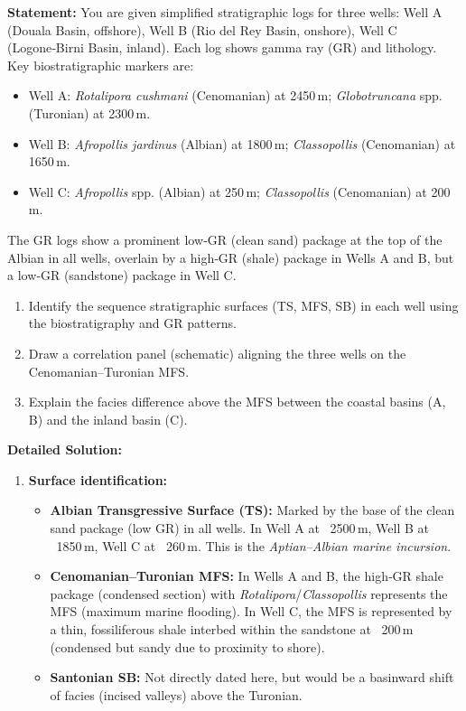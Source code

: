 \documentclass[11pt]{article}
\begin{document}
\begin{exoresolu}
\textbf{Statement:} You are given simplified stratigraphic logs for three wells: Well A (Douala Basin, offshore), Well B (Rio del Rey Basin, onshore), Well C (Logone‑Birni Basin, inland). Each log shows gamma ray (GR) and lithology. Key biostratigraphic markers are:
\begin{itemize}
\item Well A: \emph{Rotalipora cushmani} (Cenomanian) at 2450\,m; \emph{Globotruncana} spp. (Turonian) at 2300\,m.
\item Well B: \emph{Afropollis jardinus} (Albian) at 1800\,m; \emph{Classopollis} (Cenomanian) at 1650\,m.
\item Well C: \emph{Afropollis} spp. (Albian) at 250\,m; \emph{Classopollis} (Cenomanian) at 200\,m.
\end{itemize}
The GR logs show a prominent low‑GR (clean sand) package at the top of the Albian in all wells, overlain by a high‑GR (shale) package in Wells A and B, but a low‑GR (sandstone) package in Well C.
\begin{enumerate}
\item Identify the sequence stratigraphic surfaces (TS, MFS, SB) in each well using the biostratigraphy and GR patterns.
\item Draw a correlation panel (schematic) aligning the three wells on the Cenomanian–Turonian MFS.
\item Explain the facies difference above the MFS between the coastal basins (A, B) and the inland basin (C).
\end{enumerate}
\tcblower
\textbf{Detailed Solution:}
\begin{enumerate}
\item \textbf{Surface identification:}
\begin{itemize}
\item \textbf{Albian Transgressive Surface (TS):} Marked by the base of the clean sand package (low GR) in all wells. In Well A at ~2500\,m, Well B at ~1850\,m, Well C at ~260\,m. This is the \emph{Aptian–Albian marine incursion}.
\item \textbf{Cenomanian–Turonian MFS:} In Wells A and B, the high‑GR shale package (condensed section) with \emph{Rotalipora}/\emph{Classopollis} represents the MFS (maximum marine flooding). In Well C, the MFS is represented by a thin, fossiliferous shale interbed within the sandstone at ~200\,m (condensed but sandy due to proximity to shore).
\item \textbf{Santonian SB:} Not directly dated here, but would be a basinward shift of facies (incised valleys) above the Turonian.

\end{itemize}
\end{enumerate}
\end{exoresolu}
\end{document}
